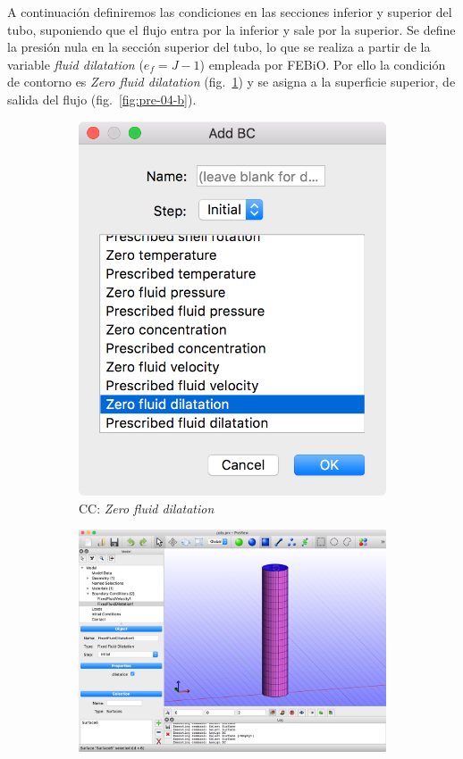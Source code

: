 A continuación definiremos las condiciones en las secciones inferior y superior del tubo, suponiendo que el flujo entra por la inferior y sale por la superior.
Se define la presión nula en la sección superior del tubo, lo que se realiza a partir de la variable \emph{fluid dilatation} ($e_{f}=J-1$) empleada por FEBiO.
Por ello la condición de contorno es \emph{Zero fluid dilatation} (fig.~\ref{fig:pre-04-a}) y se asigna a la superficie superior, de salida del flujo (fig.~\ref{fig:pre-04-b}).
\begin{figure}[!ht]
\centering
\begin{subfigure}[b]{0.20\textwidth}
\includegraphics[width=\linewidth]{figuras_4/04_pre-bc-zfd-1.png}
\caption{CC: \emph{Zero fluid dilatation}}
\label{fig:pre-04-a}
\end{subfigure}
\hfil
\begin{subfigure}[b]{0.48\textwidth}
\includegraphics[width=\linewidth]{figuras_4/04_pre-bc-zfd-2.png}

\end{subfigure}
\end{figure}
